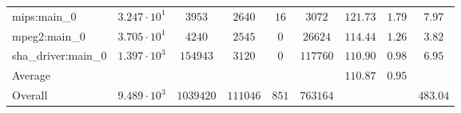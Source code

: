 \begin{tabular}{|l|c|c|c|c|c|c|c|c|}
mips:main\_0            & $ 3.247 \cdot 10^{1} $ & $ 3953    $ & $ 2640   $ & $ 16  $ & $ 3072   $ & $ 121.73      $ & $ 1.79    $ & $ 7.97    $ \\
mpeg2:main\_0           & $ 3.705 \cdot 10^{1} $ & $ 4240    $ & $ 2545   $ & $ 0   $ & $ 26624  $ & $ 114.44      $ & $ 1.26    $ & $ 3.82    $ \\
sha\_driver:main\_0     & $ 1.397 \cdot 10^{3} $ & $ 154943  $ & $ 3120   $ & $ 0   $ & $ 117760 $ & $ 110.90      $ & $ 0.98    $ & $ 6.95    $ \\
\hline
Average                 & $                    $ & $         $ & $        $ & $     $ & $        $ & $ 110.87      $ & $ 0.95    $ & $         $ \\
\hline
Overall                 & $ 9.489 \cdot 10^{3} $ & $ 1039420 $ & $ 111046 $ & $ 851 $ & $ 763164 $ & $             $ & $         $ & $ 483.04  $ \\
\hline
\end{tabular}

